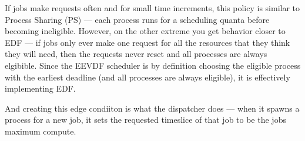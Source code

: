 If jobs make requests often and for small time increments, this policy is
similar to Process Sharing (PS) --- each process runs for a scheduling quanta
before becoming ineligible. However, on the other extreme you get behavior
closer to EDF --- if jobs only ever make one request for all the resources that
they think they will need, then the requests never reset and all processes are
always elgibible. Since the EEVDF scheduler is by definition choosing the
eligible process with the earliest deadline (and all processes are always
eligible), it is effectively implementing EDF.

And creating this edge condiiton is what the dispatcher does --- when it spawns
a process for a new job, it sets the requested timeslice of that job to be the
jobs maximum compute. 

